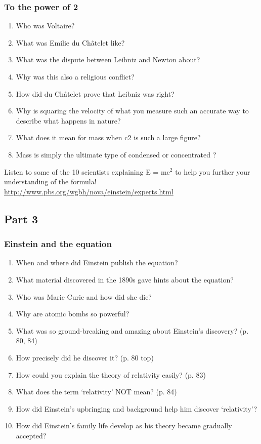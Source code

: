 \subsubsection*{To the power of 2}
\begin{enumerate}  
\item Who was Voltaire?
\item What was Emilie du Châtelet like? 
\item What was the dispute between Leibniz and Newton about?
\item Why was this also a religious conflict?
\item How did du Châtelet prove that Leibniz was right?
\item Why is squaring the velocity of what you measure such an accurate way to describe what happens in nature?
\item What does it mean for mass when c2 is such a large figure?
\item Mass is simply the ultimate type of condensed or concentrated ?
\end{enumerate}

Listen to some of the 10 scientists explaining E = mc$^2$ to help you further your understanding of the formula! \url{http://www.pbs.org/wgbh/nova/einstein/experts.html}

\subsection*{Part 3}
\subsubsection*{Einstein and the equation}
\begin{enumerate}  
\item When and where did Einstein publish the equation?
\item What material discovered in the 1890s gave hints about the equation?
\item Who was Marie Curie and how did she die?
\item Why are atomic bombs so powerful?
\item What was so ground-breaking and amazing about Einstein’s discovery? (p. 80, 84)
\item How precisely did he discover it? (p. 80 top)
\item How could you explain the theory of relativity easily? (p. 83)
\item What does the term ‘relativity’ NOT mean? (p. 84)
\item How did Einstein’s upbringing and background help him discover ‘relativity’?
\item How did Einstein’s family life develop as his theory became gradually accepted?
\end{enumerate}


